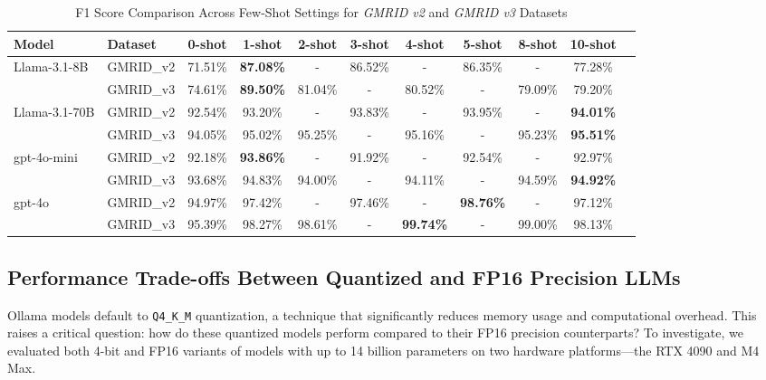 \documentclass[conference]{IEEEtran}
\begin{document}
\begin{table}[htbp]
\centering
\begin{adjustbox}{width=0.6\textwidth}
\begin{tabular}{llccccccccc}
\toprule
\textbf{Model} & Dataset & 0-shot & 1-shot & 2-shot & 3-shot & 4-shot & 5-shot & 8-shot & 10-shot \\
\midrule
\multirow{2}{*}{Llama-3.1-8B} & GMRID\_v2 & 71.51\% & \textbf{87.08\%} & - & 86.52\% & - & 86.35\% & - & 77.28\% \\
 & GMRID\_v3 & 74.61\% & \textbf{89.50\%} & 81.04\% & - & 80.52\% & - & 79.09\% & 79.20\% \\
\hline
\multirow{2}{*}{Llama-3.1-70B} & GMRID\_v2 & 92.54\% & 93.20\% & - & 93.83\% & - & 93.95\% & - & \textbf{94.01\%} \\
 & GMRID\_v3 & 94.05\% & 95.02\% & 95.25\% & - & 95.16\% & - & 95.23\% & \textbf{95.51\%} \\
\hline
\multirow{2}{*}{gpt-4o-mini} & GMRID\_v2 & 92.18\% & \textbf{93.86\%} & - & 91.92\% & - & 92.54\% & - & 92.97\% \\
 & GMRID\_v3 & 93.68\% & 94.83\% & 94.00\% & - & 94.11\% & - & 94.59\% & \textbf{94.92\%} \\
\hline
\multirow{2}{*}{gpt-4o} & GMRID\_v2 & 94.97\% & 97.42\% & - & 97.46\% & - & \textbf{98.76\%} & - & 97.12\% \\
 & GMRID\_v3 & 95.39\% & 98.27\% & 98.61\% & - & \textbf{99.74\%} & - & 99.00\% & 98.13\% \\
\bottomrule
\end{tabular}
\end{adjustbox}
\caption{F1 Score Comparison Across Few-Shot Settings for \textit{GMRID v2} and \textit{GMRID v3} Datasets}
\label{tab:few_shot_results}
\end{table}

\subsection{Performance Trade-offs Between Quantized and FP16 Precision LLMs}
\label{sec:quantization}

Ollama models default to \texttt{Q4\_K\_M} quantization, a technique that significantly reduces memory usage and computational overhead. This raises a critical question: how do these quantized models perform compared to their FP16 precision counterparts? To investigate, we evaluated both 4-bit and FP16 variants of models with up to 14 billion parameters on two hardware platforms—the RTX 4090 and M4 Max.
\end{document}
